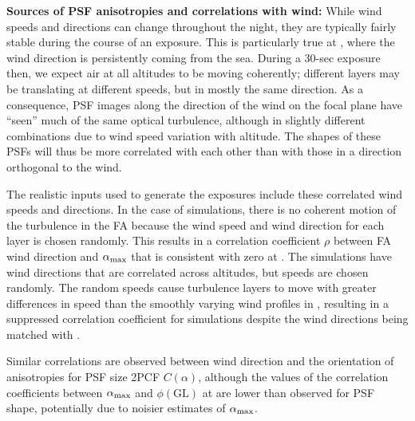\documentclass[twocolumn]{aastex631}
\begin{document}
{\bf Sources of PSF anisotropies and correlations with wind:}
While wind speeds and directions can change throughout the night, they are typically fairly stable during the course of an exposure. 
This is particularly true at \cp, where the wind direction is persistently coming from the sea.
During a 30-sec exposure then, we expect air at all altitudes to be moving coherently; different layers may be translating at different speeds, but in mostly the same direction.
As a consequence, PSF images along the direction of the wind on the focal plane have ``seen'' much of the same optical turbulence, although in slightly different combinations due to wind speed variation with altitude. 
The shapes of these PSFs will thus be more correlated with each other than with those in a direction orthogonal to the wind.

The realistic inputs used to generate the \psfwssims exposures include these  correlated wind speeds and directions. 
In the case of \bench simulations, there is no coherent motion of the turbulence in the FA because the wind speed and wind direction for each layer is chosen randomly.
This results in a correlation coefficient $\rho$ between FA wind direction and $\alpha_{\rm max}$ that is consistent with zero at \smallsep.
The \match simulations have wind directions that are correlated across altitudes, but speeds are chosen randomly. 
The random speeds cause turbulence layers to move with greater differences in speed than the smoothly varying wind profiles in \psfwssims, resulting in a suppressed correlation coefficient for \match simulations despite the wind directions being matched with \psfwssims.

Similar correlations are observed between wind direction and the orientation of anisotropies for PSF size 2PCF $C(\alpha)$, although the values of the correlation coefficients between $\alpha_{\rm max}$ and $\phi(\text{GL})$ at \largesep  are lower than observed for PSF shape, potentially due to noisier estimates of $\alpha_{\rm max}$. 
\end{document}

